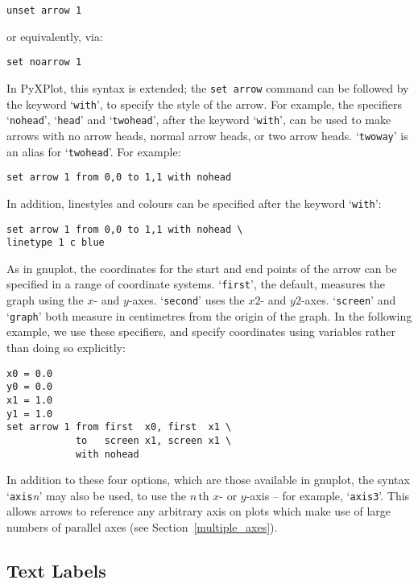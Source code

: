 \begin{verbatim}
unset arrow 1
\end{verbatim}

\noindent or equivalently, via:

\begin{verbatim}
set noarrow 1
\end{verbatim}

In PyXPlot, this syntax is extended; the {\tt set arrow} command can be
followed by the keyword `{\tt with}', to specify the style of the arrow. For
example, the specifiers `{\tt nohead}', `{\tt head}' and
`{\tt twohead}', after the keyword `{\tt with}', can be used to make
arrows with no arrow heads, normal arrow heads, or two arrow heads.
`{\tt twoway}' is an alias for `{\tt twohead}'.  For example:

\begin{verbatim}
set arrow 1 from 0,0 to 1,1 with nohead
\end{verbatim}

In addition, linestyles and colours can be specified after the keyword
`{\tt with}':

\begin{verbatim}
set arrow 1 from 0,0 to 1,1 with nohead \
linetype 1 c blue
\end{verbatim}

As in gnuplot, the coordinates for the start and end points of the arrow can be
specified in a range of coordinate systems. `{\tt first}', the default,
measures the graph using the $x$- and $y$-axes. `{\tt second}' uses the $x2$-
and $y2$-axes. `{\tt screen}' and `{\tt graph}' both measure in centimetres
from the origin of the graph. In the following example, we use these
specifiers, and specify coordinates using variables rather than doing so
explicitly:

\begin{verbatim}
x0 = 0.0
y0 = 0.0
x1 = 1.0
y1 = 1.0
set arrow 1 from first  x0, first  x1 \
            to   screen x1, screen x1 \
            with nohead
\end{verbatim}

In addition to these four options, which are those available in gnuplot, the
syntax `{\tt axis}\textit{n}' may also be used, to use the $n\,$th $x$- or
$y$-axis -- for example, `{\tt axis3}'. This allows arrows to
reference any arbitrary axis on plots which make use of large numbers of
parallel axes (see Section~\ref{multiple_axes}).

\subsection{Text Labels}

